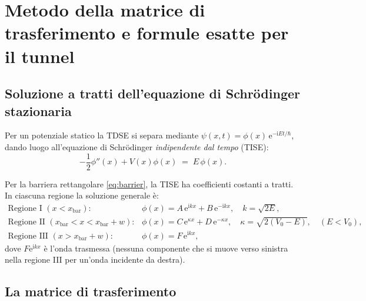 \documentclass[12pt, a4paper]{article}
\newcommand{\ii}{\mathrm{i}}          %
\newcommand{\ee}{\mathrm{e}}          %
\begin{document}
\section{Metodo della matrice di trasferimento e formule esatte per il tunnel}
\label{app:transfer}

\subsection{Soluzione a tratti dell'equazione di Schr\"{o}dinger stazionaria}

Per un potenziale statico la TDSE si separa mediante $\psi(x,t) =
\phi(x)\,\ee^{-\ii Et/\hbar}$, dando luogo all'equazione di Schr\"{o}dinger
\emph{indipendente dal tempo} (TISE):
\begin{equation}
  -\frac{1}{2}\phi''(x) + V(x)\phi(x) \;=\; E\,\phi(x).
\end{equation}

Per la barriera rettangolare \eqref{eq:barrier}, la TISE ha coefficienti
costanti a tratti. In ciascuna regione la soluzione generale è:
\begin{align}
  \text{Regione I } (x < x_\text{bar}):&\quad
    \phi(x) = A\,\ee^{\ii kx} + B\,\ee^{-\ii kx}, \quad k = \sqrt{2E}, \\
  \text{Regione II } (x_\text{bar} < x < x_\text{bar}+w):&\quad
    \phi(x) = C\,\ee^{\kappa x} + D\,\ee^{-\kappa x}, \quad
    \kappa = \sqrt{2(V_0-E)},\quad (E<V_0), \\
  \text{Regione III } (x > x_\text{bar}+w):&\quad
    \phi(x) = F\,\ee^{\ii kx},
\end{align}
dove $F\ee^{\ii kx}$ è l'onda trasmessa (nessuna componente che si muove
verso sinistra nella regione III per un'onda incidente da destra).

\subsection{La matrice di trasferimento}
\end{document}
